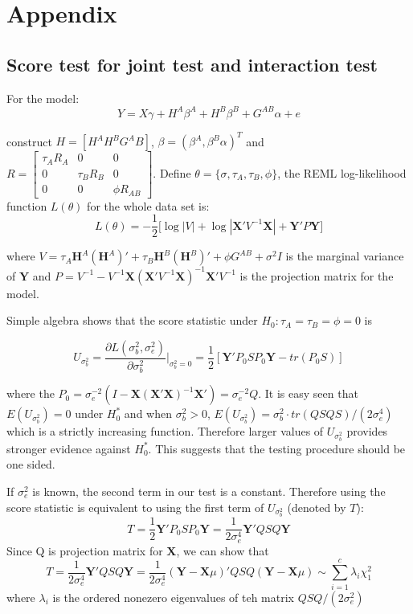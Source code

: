 \documentclass{article}
\newcommand{\Y}{\mathbf{Y}}
\newcommand{\X}{\mathbf{X}}
\newcommand{\HH}{\mathbf{H}}
\begin{document}
    \section{Appendix}

        \subsection{Score test for joint test and interaction test}

            For the model:
            \begin{equation*}
                Y=X\gamma+H^A\beta^A+H^B\beta^B+G^{AB}\alpha+e
            \end{equation*}

            construct $H=[H^A H^B G^AB]$, $\beta=(\beta^A, \beta^B \alpha)^T$ and $R=\begin{bmatrix}\tau_A R_A&0&0\\0&\tau_B R_B &0\\0&0&\phi R_{AB} \end{bmatrix} $.
            Define $\theta=\{\sigma,\tau_A,\tau_B,\phi\}$, the REML log-likelihood function $L(\theta)$ for the whole data set is:
            \[
                L(\theta)=-\frac{1}{2}\bigg[\log|V|+\log|\X'V^{-1}\X|+\Y'P\Y\bigg]
            \]

             where $V=\tau_A\HH^A (\HH^A)'+\tau_B \HH^B (\HH^B)'+\phi G^{AB}+\sigma^2I$ is the marginal variance of $\Y$ and $P=V^{-1}-V^{-1}\X(\X'V^{-1}\X)^{-1}\X'V^{-1}$ is the projection matrix for the model.

            Simple algebra shows that the score statistic under $H_0:\tau_A=\tau_B=\phi=0$ is

            \[
                U_{\sigma^2_b}=\frac{\partial L(\sigma^2_b,\sigma^2_e)}{\partial \sigma^2_b}\bigg|_{\sigma^2_b=0}=\frac{1}{2}[\Y'P_0SP_0\Y-tr(P_0S)]
            \]

            where the $P_0=\sigma^{-2}_e(I-\X(\X'\X)^{-1}\X')=\sigma^{-2}_eQ$. It is easy seen that $E(U_{\sigma^2_b})=0$ under $H_0^*$ and when $\sigma^2_b>0$, $E(U_{\sigma^2_b})=\sigma^2_b\cdot tr(QSQS)/(2\sigma^4_e)$ which is a strictly increasing function. Therefore larger values of $U_{\sigma_b^2}$ provides stronger evidence against $H_0^*$. This suggests that the testing procedure should be one sided.

            If $\sigma_e^2$ is known, the second term in our test is a constant. Therefore using the score statistic is equivalent to using the first term of $U_{\sigma^2_b}$ (denoted by $T$):
            \[
                T=\frac{1}{2}\Y'P_0SP_0\Y=\frac{1}{2\sigma^4_e}\Y'QSQ\Y
            \]
            Since Q is projection matrix for $\X$, we can show that
            \[
                T=\frac{1}{2\sigma^4_e}\Y'QSQ\Y=\frac{1}{2\sigma^4_e}(\Y-\X\mu)'QSQ(\Y-\X\mu)\sim\sum_{i=1}^c\lambda_i\chi^2_1
            \]
            where $\lambda_i$ is the ordered nonezero eigenvalues of teh matrix $QSQ/(2\sigma^2_e)$
\end{document}
